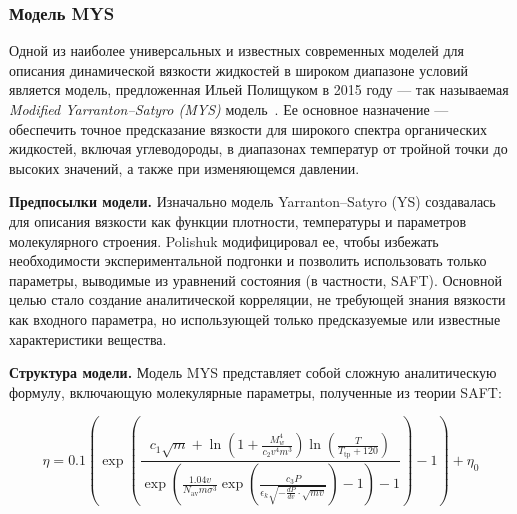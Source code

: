 \documentclass[a4paper,12pt]{article}
\begin{document}
    \subsubsection{Модель MYS}

      Одной из наиболее универсальных и известных современных моделей для описания динамической вязкости жидкостей в широком диапазоне условий является модель, предложенная Ильей Полищуком в 2015 году — так называемая \textit{Modified Yarranton–Satyro (MYS)} модель~\cite{polishuk2015viscosity}. Ее основное назначение — обеспечить точное предсказание вязкости для широкого спектра органических жидкостей, включая углеводороды, в диапазонах температур от тройной точки до высоких значений, а также при изменяющемся давлении.

      \textbf{Предпосылки модели.}  
      Изначально модель Yarranton–Satyro (YS) создавалась для описания вязкости как функции плотности, температуры и параметров молекулярного строения. Polishuk модифицировал ее, чтобы избежать необходимости экспериментальной подгонки и позволить использовать только параметры, выводимые из уравнений состояния (в частности, SAFT). Основной целью стало создание аналитической корреляции, не требующей знания вязкости как входного параметра, но использующей только предсказуемые или известные характеристики вещества.
      
      \textbf{Структура модели.}  
      Модель MYS представляет собой сложную аналитическую формулу, включающую молекулярные параметры, полученные из теории SAFT:
      
      \begin{equation}
        \eta = 0.1 \left( \exp \left( \frac{c_1 \sqrt{m} + \ln \left( 1 + \frac{M_w^4}{c_2 v^4 m^3} \right) \ln \left( \frac{T}{T_{\text{tp}} + 120} \right)}{
        \exp \left( \frac{1.04 v}{N_{\text{av}} m \sigma^3} \exp \left( \frac{c_3 P}{\epsilon_k \sqrt{-\frac{dP}{dv} \cdot \sqrt{m v}}} \right) - 1 \right) - 1} 
        \right) - 1 \right) + \eta_0
        \label{eq:mys}
      \end{equation}
      
\end{document}
